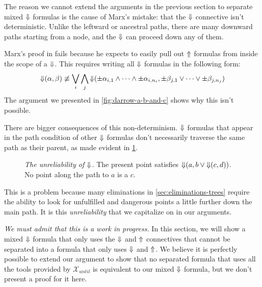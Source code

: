 \documentclass[a4paper,UKenglish,cleveref, autoref, thm-restate, numberwithinsect]{lipics-v2021}
\def\Uarrow{\ensuremath\mathord{\Uparrow}}
\def\Darrow{\ensuremath\mathord{\Downarrow}}
\begin{document}
The reason we cannot extend the arguments in the previous section to separate mixed $\Darrow$ formulas is the cause of Marx's mistake: that the $\Darrow$ connective isn't deterministic. Unlike the leftward or ancestral paths, there are many downward paths starting from a node, and the $\Darrow$ can proceed down any of them.

Marx's proof in \cite{xpathComplete} fails because he expects to easily pull out $\Uarrow$ formulas from inside the scope of a $\Darrow$. This requires writing all $\Darrow$ formulas in the following form:
\begin{equation*}
    \Darrow(\alpha, \beta) \not\equiv \bigvee_i \bigwedge_j \Darrow( \pm \alpha_{i, 1} \land \cdots \land \pm \alpha_{i, n_i}, \pm \beta_{j, 1} \lor \cdots \lor \pm \beta_{j, n_j})
\end{equation*}
The argument we presented in \cref{fig:darrow-a-b-and-c} shows why this isn't possible.

There are bigger consequences of this non-determinism. $\Darrow$ formulas that appear in the path condition of other $\Darrow$ formulas don't necessarily traverse the same path as their parent, as made evident in \cref{fnreliable}.

\begin{figure}[h]
    \centering
    \caption{\emph{The unreliability of $\Darrow$.} The present point satisfies $\Darrow(a, b \lor \Darrow(c, d))$. No point along the path to $a$ is a $c$.}
    \label{fnreliable}
\end{figure}

This is a problem because many eliminations in \cref{sec:eliminations-trees} require the ability to look for unfulfilled and dangerous points a little further down the main path. It is this \textit{unreliability} that we capitalize on in our arguments.


\textit{We must admit that this is a work in progress.} In this section, we will show a mixed $\Darrow$ formula that only uses the $\Darrow$ and $\Uarrow$ connectives that cannot be separated into a formula that only uses $\Darrow$ and $\Uarrow$. We believe it is perfectly possible to extend our argument to show that no separated formula that uses all the tools provided by $\mathcal{X}_{until}$ is equivalent to our mixed $\Darrow$ formula, but we don't present a proof for it here.
\end{document}
